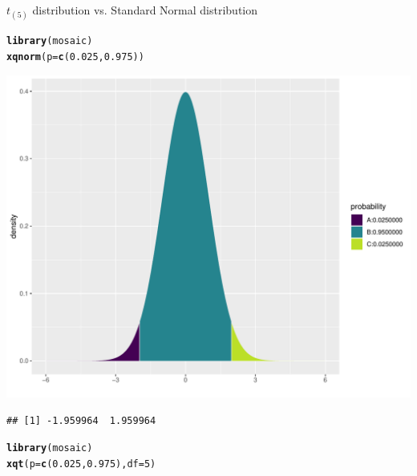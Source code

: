 \documentclass{beamer}\usepackage[]{graphicx}\usepackage[]{color}
\newcommand{\hlnum}[1]{\textcolor[rgb]{0.686,0.059,0.569}{#1}}%
\newcommand{\hlstd}[1]{\textcolor[rgb]{0.345,0.345,0.345}{#1}}%
\newcommand{\hlkwc}[1]{\textcolor[rgb]{0.333,0.667,0.333}{#1}}%
\newcommand{\hlkwd}[1]{\textcolor[rgb]{0.737,0.353,0.396}{\textbf{#1}}}%
\newenvironment{knitrout}{}{} %
\begin{document}
\begin{frame}[fragile]{$t_{(5)}$ distribution vs. Standard Normal distribution}
\begin{minipage}{0.47\textwidth}
\begin{knitrout}\scriptsize
{}\color{fgcolor}
\begin{alltt}
\hlkwd{library}\hlstd{(mosaic)}
\hlkwd{xqnorm}\hlstd{(}\hlkwc{p} \hlstd{=} \hlkwd{c}\hlstd{(}\hlnum{0.025}\hlstd{,} \hlnum{0.975}\hlstd{))}
\end{alltt}

\end{knitrout}
\begin{knitrout}\scriptsize
{}\color{fgcolor}

{\centering \includegraphics[width=1\linewidth]{figure/unnamed-chunk-2-1} 

}


\begin{verbatim}
## [1] -1.959964  1.959964
\end{verbatim}

\end{knitrout}
\end{minipage}
\begin{minipage}{0.5\textwidth}
\begin{knitrout}\scriptsize
{}\color{fgcolor}
\begin{alltt}
\hlkwd{library}\hlstd{(mosaic)}
\hlkwd{xqt}\hlstd{(}\hlkwc{p} \hlstd{=} \hlkwd{c}\hlstd{(}\hlnum{0.025}\hlstd{,} \hlnum{0.975}\hlstd{),} \hlkwc{df} \hlstd{=} \hlnum{5}\hlstd{)}
\end{alltt}



\end{knitrout}
\end{minipage}
\end{frame}
\end{document}
